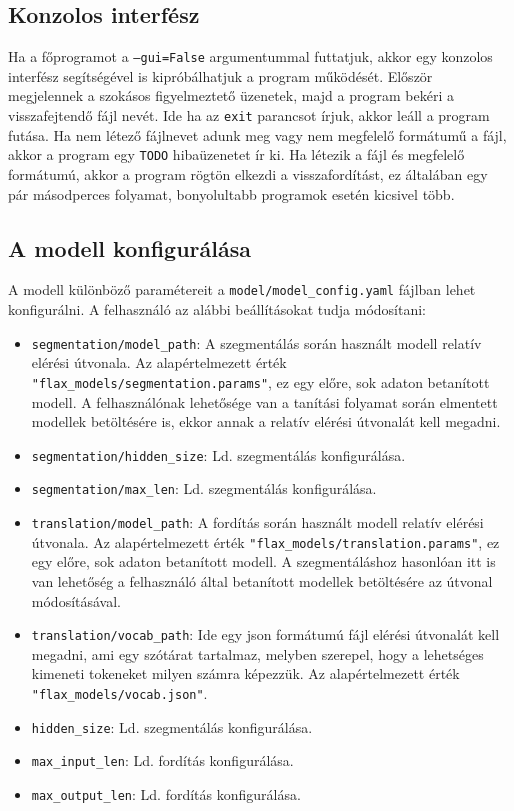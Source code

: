 \subsection{Konzolos interfész}
Ha a főprogramot a \texttt{--gui=False} argumentummal futtatjuk, akkor egy
konzolos interfész segítségével is kipróbálhatjuk a program működését. Először
megjelennek a szokásos figyelmeztető üzenetek, majd a program bekéri
a visszafejtendő fájl nevét. Ide ha az \texttt{exit} parancsot írjuk, akkor
leáll a program futása. Ha nem létező fájlnevet adunk meg vagy nem megfelelő
formátumű a fájl, akkor a program egy
\texttt{TODO} hibaüzenetet ír ki. Ha létezik a fájl és megfelelő formátumú,
akkor a program rögtön elkezdi a visszafordítást, ez általában egy pár
másodperces folyamat, bonyolultabb programok esetén kicsivel több.

\subsection{A modell konfigurálása}
A modell különböző paramétereit a \texttt{model/model\_config.yaml} fájlban
lehet konfigurálni. A felhasználó az alábbi beállításokat tudja módosítani:
\begin{itemize}
    \item \texttt{segmentation/model\_path}: A szegmentálás során használt
        modell relatív elérési útvonala. Az alapértelmezett érték
        \texttt{"flax\_models/segmentation.params"}, ez egy előre, sok adaton
        betanított modell. A felhasználónak lehetősége van a tanítási folyamat
        során elmentett modellek betöltésére is, ekkor annak a relatív elérési
        útvonalát kell megadni.
    \item \texttt{segmentation/hidden\_size}: Ld. szegmentálás konfigurálása.
    \item \texttt{segmentation/max\_len}: Ld. szegmentálás konfigurálása.
    \item \texttt{translation/model\_path}: A fordítás során használt modell
        relatív elérési útvonala. Az alapértelmezett érték
        \texttt{"flax\_models/translation.params"}, ez egy előre, sok adaton
        betanított modell. A szegmentáláshoz hasonlóan itt is van lehetőség
        a felhasználó által betanított modellek betöltésére az útvonal
        módosításával.
    \item \texttt{translation/vocab\_path}: Ide egy json formátumú fájl elérési
        útvonalát kell megadni, ami egy szótárat tartalmaz, melyben szerepel,
        hogy a lehetséges kimeneti tokeneket milyen számra képezzük. Az
        alapértelmezett érték \texttt{"flax\_models/vocab.json"}.
    \item \texttt{hidden\_size}: Ld. szegmentálás konfigurálása.
    \item \texttt{max\_input\_len}: Ld. fordítás konfigurálása.
    \item \texttt{max\_output\_len}: Ld. fordítás konfigurálása.
\end{itemize}

